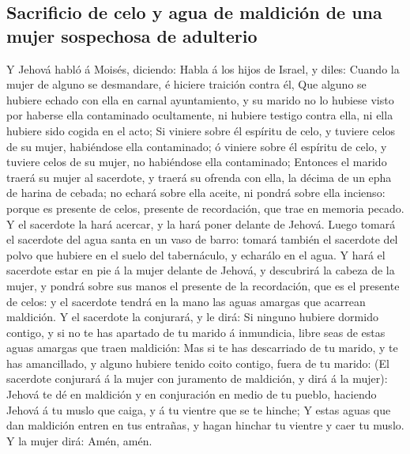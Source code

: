 \hypertarget{sacrificio-de-celo-y-agua-de-maldiciuxf3n-de-una-mujer-sospechosa-de-adulterio}{%
\subsection{Sacrificio de celo y agua de maldición de una mujer
sospechosa de
adulterio}\label{sacrificio-de-celo-y-agua-de-maldiciuxf3n-de-una-mujer-sospechosa-de-adulterio}}

 Y Jehová habló á Moisés, diciendo:  Habla
á los hijos de Israel, y diles: Cuando la mujer de alguno se desmandare,
é hiciere traición contra él,  Que alguno se hubiere
echado con ella en carnal ayuntamiento, y su marido no lo hubiese visto
por haberse ella contaminado ocultamente, ni hubiere testigo contra
ella, ni ella hubiere sido cogida en el acto;  Si viniere
sobre él espíritu de celo, y tuviere celos de su mujer, habiéndose ella
contaminado; ó viniere sobre él espíritu de celo, y tuviere celos de su
mujer, no habiéndose ella contaminado;  Entonces el
marido traerá su mujer al sacerdote, y traerá su ofrenda con ella, la
décima de un epha de harina de cebada; no echará sobre ella aceite, ni
pondrá sobre ella incienso: porque es presente de celos, presente de
recordación, que trae en memoria pecado.  Y el sacerdote
la hará acercar, y la hará poner delante de Jehová. 
Luego tomará el sacerdote del agua santa en un vaso de barro: tomará
también el sacerdote del polvo que hubiere en el suelo del tabernáculo,
y echarálo en el agua.  Y hará el sacerdote estar en pie
á la mujer delante de Jehová, y descubrirá la cabeza de la mujer, y
pondrá sobre sus manos el presente de la recordación, que es el presente
de celos: y el sacerdote tendrá en la mano las aguas amargas que
acarrean maldición.  Y el sacerdote la conjurará, y le
dirá: Si ninguno hubiere dormido contigo, y si no te has apartado de tu
marido á inmundicia, libre seas de estas aguas amargas que traen
maldición:  Mas si te has descarriado de tu marido, y te
has amancillado, y alguno hubiere tenido coito contigo, fuera de tu
marido:  (El sacerdote conjurará á la mujer con juramento
de maldición, y dirá á la mujer): Jehová te dé en maldición y en
conjuración en medio de tu pueblo, haciendo Jehová á tu muslo que caiga,
y á tu vientre que se te hinche;  Y estas aguas que dan
maldición entren en tus entrañas, y hagan hinchar tu vientre y caer tu
muslo. Y la mujer dirá: Amén, amén.


